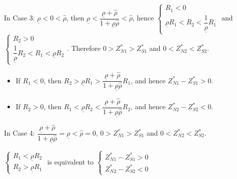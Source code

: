 \documentclass[10pt]{article}
\begin{document}
In Case 3: $ \underline{\rho} < 0 < {\hat \rho} $, then $ \underline{\rho} < \dfrac{\underline{\rho} + {\hat \rho}}{1 + \underline{\rho} {\hat \rho}} < {\hat \rho} $, hence $ \left\{ \begin{matrix} R_1 < 0 \\ \underline{\rho} R_1 < R_2 < \dfrac{1}{\underline{\rho}} R_1 \end{matrix} \right. $ and $ \left\{ \begin{matrix} R_2 > 0 \\ \dfrac{1}{\underline{\rho}} R_2 < R_1 < \underline{\rho} R_2 \end{matrix} \right. $.
Therefore $ 0 > Z_{N 1}^* > Z_{S 1}^* $ and $ 0 < Z_{N 2}^* < Z_{S 2}^* $.
\begin{itemize}
\item If $ R_1 < 0 $, then $ R_2 > \underline{\rho} R_1 > \dfrac{\underline{\rho} + {\hat \rho}}{1 + \underline{\rho} {\hat \rho}} R_1 $, and hence $ Z_{N 1}^* - Z_{S 1}^* > 0 $.
\item If $ R_2 > 0 $, then $ R_1 < \underline{\rho} R_2 < \dfrac{\underline{\rho} + {\hat \rho}}{1 + \underline{\rho} {\hat \rho}} R_2 $, and hence $ Z_{N 2}^* - Z_{S 2}^* < 0 $.
\end{itemize}

In Case 4: $ \dfrac{\underline{\rho} + {\hat \rho}}{1 + \underline{\rho} {\hat \rho}} = \underline{\rho} < {\hat \rho} = 0 $, $ 0 > Z_{N 1}^* > Z_{S 1}^* $ and $ 0 < Z_{N 2}^* < Z_{S 2}^* $.

$ \left\{ \begin{matrix} R_1 < \underline{\rho} R_2 \\ R_2 > \underline{\rho} R_1 \end{matrix} \right. $ is equivalent to $ \left\{ \begin{matrix} Z_{N 1}^* - Z_{S 1}^* > 0 \\ Z_{N 2}^* - Z_{S 2}^* < 0 \end{matrix} \right. $
\end{document}
